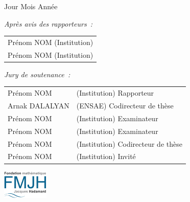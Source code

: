 \documentclass[a4paper,12pt]{book}
\begin{document}
{\vspace{10mm}

 Jour Mois Ann\'ee

\vspace{5mm}

\noindent
{\small \it Apr\`es avis des rapporteurs~: }
\begin{tabular}{l} {\sc Pr\'enom NOM} (Institution)\vspace{1mm}  \\
{\sc  Pr\'enom NOM} (Institution)\\
\end{tabular}

\vspace{8mm}

\noindent
{\small \it Jury de soutenance~: }
\begin{tabular}{ll}
{\sc   Pr\'enom NOM}&(Institution) {\small Rapporteur}\vspace{1mm}\\
{\sc   Arnak DALALYAN}&(ENSAE) {\small Codirecteur de th\`ese}\vspace{1mm}\\
{\sc   Pr\'enom NOM}&(Institution) {\small Examinateur}\vspace{1mm}\\
{\sc   Pr\'enom NOM}&(Institution) {\small Examinateur}\vspace{1mm}\\
{\sc   Pr\'enom NOM}&(Institution) {\small Codirecteur de th\`ese}\vspace{1mm}\\
{\sc   Pr\'enom NOM}&(Institution) {\small Invit\'e}\vspace{1mm}\\
\end{tabular}
\noindent
\hbox{\includegraphics[width=2.2cm]{logo_fmjh.jpg}}
}
\end{document}
